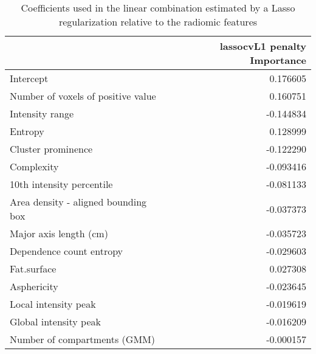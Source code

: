 \begin{table}
\caption{Coefficients used in the linear combination estimated by a Lasso regularization relative to the radiomic features \label{tab:ParamRadICU}}
\centering 
	\begin{tabular}{lr}
	\toprule
	{} &  lassocvL1 penalty Importance \\
	\midrule
	Intercept                           &                      0.176605 \\
	Number of voxels of positive value  &                      0.160751 \\
	Intensity range                     &                     -0.144834 \\
	Entropy                             &                      0.128999 \\
	Cluster prominence                  &                     -0.122290 \\
	Complexity                          &                     -0.093416 \\
	10th intensity percentile           &                     -0.081133 \\
	Area density - aligned bounding box &                     -0.037373 \\
	Major axis length (cm)              &                     -0.035723 \\
	Dependence count entropy            &                     -0.029603 \\
	Fat.surface                         &                      0.027308 \\
	Asphericity                         &                     -0.023645 \\
	Local intensity peak                &                     -0.019619 \\
	Global intensity peak               &                     -0.016209 \\
	Number of compartments (GMM)        &                     -0.000157 \\
	\bottomrule
	\end{tabular}
\end{table}

